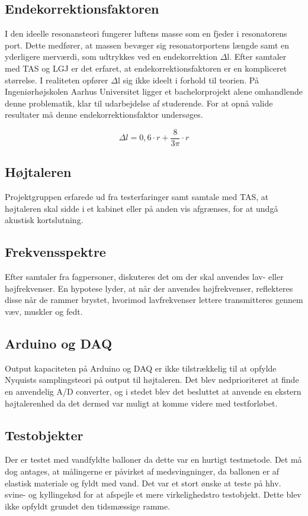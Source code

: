 \subsection{Endekorrektionsfaktoren}
I den ideelle resonansteori fungerer luftens masse som en fjeder i resonatorens port. Dette medfører, at massen bevæger sig resonatorportens længde samt en yderligere merværdi, som udtrykkes ved en endekorrektion $\Delta$l.
Efter samtaler med TAS og LGJ er det erfaret, at endekorrektionsfaktoren er en kompliceret størrelse. I realiteten opfører $\Delta$l sig ikke ideelt i forhold til teorien. På Ingeniørhøjskolen Aarhus Universitet ligger et bachelorprojekt alene omhandlende denne problematik, klar til udarbejdelse af studerende. For at opnå valide resultater må denne endekorrektionsfaktor undersøges. 

\begin{equation}
		\Delta l = 0,6 \cdot r + \frac{8}{3\pi} \cdot r
\end{equation}

\subsection{Højtaleren}
Projektgruppen erfarede ud fra testerfaringer samt samtale med TAS, at højtaleren skal sidde i et kabinet eller på anden vis afgrænses, for at undgå akustisk kortslutning.  

\subsection{Frekvensspektre}
Efter samtaler fra fagpersoner, diskuteres det om der skal anvendes lav- eller højfrekvenser. En hypotese lyder, at når der anvendes højfrekvenser, reflekteres disse når de rammer brystet, hvorimod lavfrekvenser lettere transmitteres gennem væv, muskler og fedt.

\subsection{Arduino og DAQ}
Output kapaciteten på Arduino og DAQ er ikke tilstrækkelig til at opfylde Nyquists samplingsteori på output til højtaleren. Det blev nedprioriteret at finde en anvendelig A/D converter, og i stedet blev det besluttet at anvende en ekstern højtalerenhed da det dermed var muligt at komme videre med testforløbet. 

\subsection{Testobjekter}
Der er testet med vandfyldte balloner da dette var en hurtigt testmetode. Det må dog antages, at målingerne er påvirket af medsvingninger, da ballonen er af elastisk materiale og fyldt med vand. Det var et stort ønske at teste på hhv. svine- og kyllingekød for at afspejle et mere virkelighedstro testobjekt. Dette blev ikke opfyldt grundet den tidsmæssige ramme.  

 


